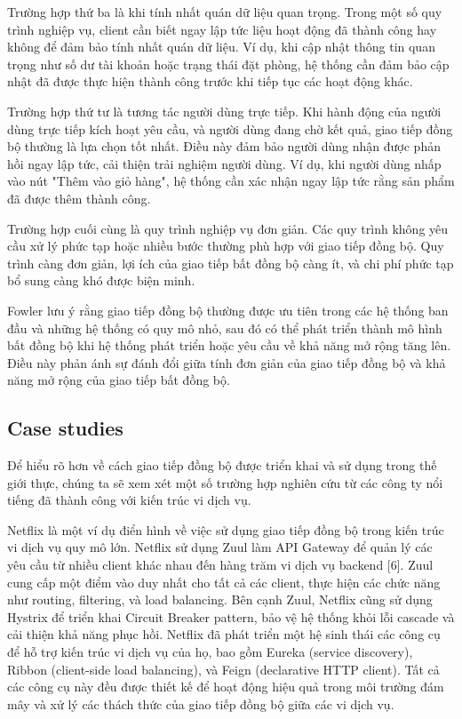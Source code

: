 Trường hợp thứ ba là khi tính nhất quán dữ liệu quan trọng. Trong một số quy trình nghiệp vụ, client cần biết ngay lập tức liệu hoạt động đã thành công hay không để đảm bảo tính nhất quán dữ liệu. Ví dụ, khi cập nhật thông tin quan trọng như số dư tài khoản hoặc trạng thái đặt phòng, hệ thống cần đảm bảo cập nhật đã được thực hiện thành công trước khi tiếp tục các hoạt động khác.

Trường hợp thứ tư là tương tác người dùng trực tiếp. Khi hành động của người dùng trực tiếp kích hoạt yêu cầu, và người dùng đang chờ kết quả, giao tiếp đồng bộ thường là lựa chọn tốt nhất. Điều này đảm bảo người dùng nhận được phản hồi ngay lập tức, cải thiện trải nghiệm người dùng. Ví dụ, khi người dùng nhấp vào nút "Thêm vào giỏ hàng", hệ thống cần xác nhận ngay lập tức rằng sản phẩm đã được thêm thành công.

Trường hợp cuối cùng là quy trình nghiệp vụ đơn giản. Các quy trình không yêu cầu xử lý phức tạp hoặc nhiều bước thường phù hợp với giao tiếp đồng bộ. Quy trình càng đơn giản, lợi ích của giao tiếp bất đồng bộ càng ít, và chi phí phức tạp bổ sung càng khó được biện minh.

Fowler \cite{fowler2014} lưu ý rằng giao tiếp đồng bộ thường được ưu tiên trong các hệ thống ban đầu và những hệ thống có quy mô nhỏ, sau đó có thể phát triển thành mô hình bất đồng bộ khi hệ thống phát triển hoặc yêu cầu về khả năng mở rộng tăng lên. Điều này phản ánh sự đánh đổi giữa tính đơn giản của giao tiếp đồng bộ và khả năng mở rộng của giao tiếp bất đồng bộ.

\subsection{Case studies}
Để hiểu rõ hơn về cách giao tiếp đồng bộ được triển khai và sử dụng trong thế giới thực, chúng ta sẽ xem xét một số trường hợp nghiên cứu từ các công ty nổi tiếng đã thành công với kiến trúc vi dịch vụ.

Netflix là một ví dụ điển hình về việc sử dụng giao tiếp đồng bộ trong kiến trúc vi dịch vụ quy mô lớn. Netflix sử dụng Zuul làm API Gateway để quản lý các yêu cầu từ nhiều client khác nhau đến hàng trăm vi dịch vụ backend [6]. Zuul cung cấp một điểm vào duy nhất cho tất cả các client, thực hiện các chức năng như routing, filtering, và load balancing. Bên cạnh Zuul, Netflix cũng sử dụng Hystrix để triển khai Circuit Breaker pattern, bảo vệ hệ thống khỏi lỗi cascade và cải thiện khả năng phục hồi. Netflix đã phát triển một hệ sinh thái các công cụ để hỗ trợ kiến trúc vi dịch vụ của họ, bao gồm Eureka (service discovery), Ribbon (client-side load balancing), và Feign (declarative HTTP client). Tất cả các công cụ này đều được thiết kế để hoạt động hiệu quả trong môi trường đám mây và xử lý các thách thức của giao tiếp đồng bộ giữa các vi dịch vụ.

